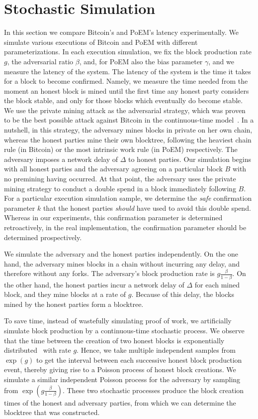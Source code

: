 \section{Stochastic Simulation}
In this section we compare Bitcoin's and PoEM's latency experimentally.
We simulate various executions of Bitcoin and PoEM with different parameterizations.
In each execution simulation, we fix the block production rate $g$, the adversarial ratio $\beta$,
and, for PoEM also the bias parameter $\gamma$, and we
measure the latency of the system.
The latency of the system is the time it takes for a block to become confirmed.
Namely, we measure the time needed from the moment an honest block is mined until
the first time any honest party considers the block stable, and only for those blocks
which eventually do become stable.
We use the private mining attack as the adversarial strategy, which was
proven~\cite{eiar} to be the best possible attack against Bitcoin in the continuous-time model~\cite{bitcoin-made-simple}.
In a nutshell, in this strategy, the adversary mines blocks in private on her own chain, whereas the honest parties mine
their own blocktree, following the heaviest chain rule (in Bitcoin) or the most intrinsic work rule (in PoEM) respectively.
The adversary imposes a network delay of $\Delta$ to honest parties.
Our simulation begins with all honest parties and the adversary agreeing on a particular block
$B$ with no premining having occurred. At that point, the adversary uses the private mining strategy
to conduct a double spend in a block immediately following $B$.
For a particular execution simulation sample, we determine the \emph{safe} confirmation parameter $k$
that the honest parties \emph{should} have used to avoid this double spend.
Whereas in our experiments, this confirmation parameter is determined retroactively,
in the real implementation, the confirmation parameter should be determined prospectively.

We simulate the adversary and the honest parties independently. On the one hand, the adversary mines blocks
in a chain without incurring any delay, and therefore without any forks. The adversary's block production rate is
$g\frac{\beta}{1 - \beta}$. On the other hand, the honest parties incur a network delay of $\Delta$ for each mined block,
and they mine blocks at a rate of $g$. Because of this delay, the blocks mined by the honest parties form a blocktree.

To save time, instead of wastefully simulating proof of work, we artificially simulate block production by a
continuous-time stochastic process.
We observe that the time between the creation of two honest blocks is exponentially distributed~\cite{bitcoin-made-simple}
with rate $g$.
Hence, we take multiple independent samples from $\exp(g)$ to get the interval between each successive honest block production event,
thereby giving rise to a Poisson process of honest block creations. We simulate a similar independent Poisson process for the adversary
by sampling from $\exp(g\frac{\beta}{1 - \beta})$. These two stochastic processes produce the block creation times of the honest and
adversary parties, from which we can determine the blocktree that was constructed.

